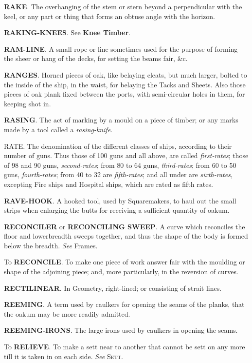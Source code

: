 \textbf{RAKE}. The overhanging of the stem or stern beyond a perpendicular with the keel, or any part or thing that forms an obtuse angle with the horizon. 

\textbf{RAKING-KNEES}. See \textbf{Knee Timber}. 

\textbf{RAM-LINE}. A small rope or line sometimes used for the purpose of forming the sheer or hang of the decks, for setting the beams fair, \&c. 

\textbf{RANGES}. Horned pieces of oak, like belaying cleats, but much larger, bolted to the inside of the ship, in the waist, for belaying the Tacks and Sheets. Also those pieces of oak plank fixed between the ports, with semi-circular holes in them, for keeping shot in. 

\textbf{RASING}. The act of marking by a mould on a piece of timber; or any marks made by a tool called a \textit{rasing-knife}.

RATE. The denomination of the different classes of ships, according to their number of guns. Thus those of 100 guns and all above, are called \textit{first-rates}; those of 98 and 90 guns, \textit{second-rates}; from 80 to 64 guns, \textit{third-rates}; from 60 to 50 guns, \textit{fourth-rates}; from 40 to 32 are \textit{fifth-rates}; and all under are \textit{sixth-rates}, excepting Fire ships and Hospital ships, which are rated as fifth rates. 

\textbf{RAVE-HOOK}. A hooked tool, used by Squaremakers, to haul out the small strips when enlarging the butts for receiving a sufficient quantity of oakum. 

\textbf{RECONCILER} or \textbf{RECONCILING SWEEP}. A curve which reconciles the floor and lowerbreadth sweeps together, and thus the shape of the body is formed below the breadth. \textit{See} Frames. 

To \textbf{RECONCILE}. To make one piece of work answer fair with the moulding or shape of the adjoining piece; and, more particularly, in the reversion of curves. 

\textbf{RECTILINEAR}. In Geometry, right-lined; or consisting of strait lines. 

\textbf{REEMING}. A term used by caulkers for opening the seams of the planks, that the oakum may be more readily admitted. 

\textbf{REEMING-IRONS}. The large irons used by caulkers in opening the seams. 

To \textbf{RELIEVE}. To make a sett near to another that cannot be sett on any more till it is taken in on each side. \textit{See} \textsc{Sett}. 

